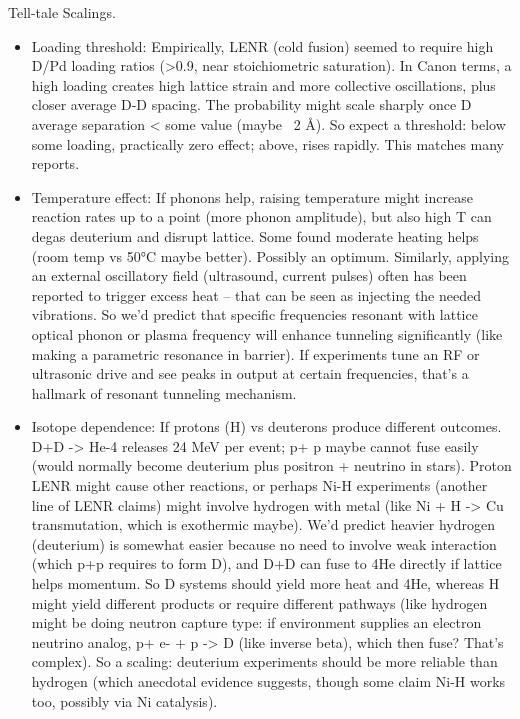 \documentclass[11pt]{article}
\begin{document}
\begin{itemize}
\end{itemize}

Tell-tale Scalings.


\begin{itemize}

\item 
Loading threshold: Empirically, LENR (cold fusion) seemed to require high D/Pd loading ratios (>0.9, near stoichiometric saturation). In Canon terms, a high loading creates high lattice strain and more collective oscillations, plus closer average D-D spacing. The probability might scale sharply once D average separation < some value (maybe ~2 Å). So expect a threshold: below some loading, practically zero effect; above, rises rapidly. This matches many reports.




\item 
Temperature effect: If phonons help, raising temperature might increase reaction rates up to a point (more phonon amplitude), but also high T can degas deuterium and disrupt lattice. Some found moderate heating helps (room temp vs 50°C maybe better). Possibly an optimum. Similarly, applying an external oscillatory field (ultrasound, current pulses) often has been reported to trigger excess heat – that can be seen as injecting the needed vibrations. So we’d predict that specific frequencies resonant with lattice optical phonon or plasma frequency will enhance tunneling significantly (like making a parametric resonance in barrier). If experiments tune an RF or ultrasonic drive and see peaks in output at certain frequencies, that’s a hallmark of resonant tunneling mechanism.




\item 
Isotope dependence: If protons (H) vs deuterons produce different outcomes. D+D -> He-4 releases 24 MeV per event; p+ p maybe cannot fuse easily (would normally become deuterium plus positron + neutrino in stars). Proton LENR might cause other reactions, or perhaps Ni-H experiments (another line of LENR claims) might involve hydrogen with metal (like Ni + H -> Cu transmutation, which is exothermic maybe). We’d predict heavier hydrogen (deuterium) is somewhat easier because no need to involve weak interaction (which p+p requires to form D), and D+D can fuse to 4He directly if lattice helps momentum. So D systems should yield more heat and 4He, whereas H might yield different products or require different pathways (like hydrogen might be doing neutron capture type: if environment supplies an electron neutrino analog, p+ e- + p -> D (like inverse beta), which then fuse? That’s complex). So a scaling: deuterium experiments should be more reliable than hydrogen (which anecdotal evidence suggests, though some claim Ni-H works too, possibly via Ni catalysis).





\end{itemize}
\end{document}
